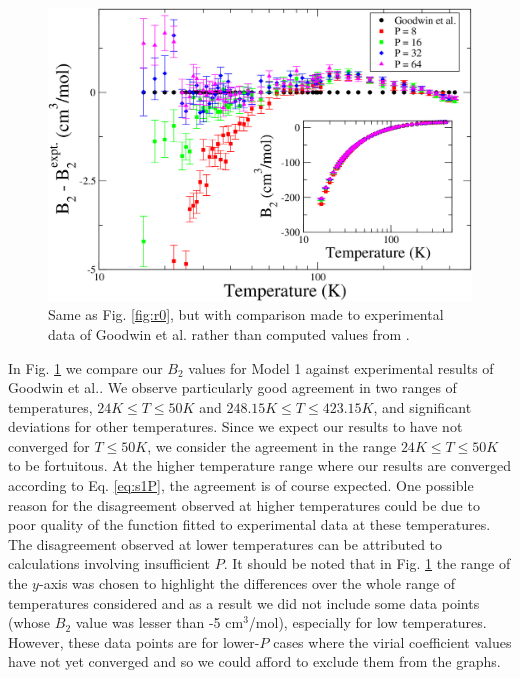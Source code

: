                 \begin{figure}[!htbp]
                    \centering
                    \includegraphics[scale=0.20,keepaspectratio]{Chapter-4/Figures/s1GoodwinAll.png}
                    \caption{Same as Fig. \ref{fig:r0}, but with comparison made to experimental data of Goodwin et al.\cite{Goodwin1963} rather than computed values from \cite{Garberoglio2014}.}
                    \label{fig:r0Goodwin}
                \end{figure}
                In Fig. \ref{fig:r0Goodwin} we compare our $B_2$ values for Model 1 against experimental results of Goodwin et al.\cite{Goodwin1963}. We observe particularly good agreement in two ranges of temperatures, $24 K \le T \le 50 K$ and $ 248.15 K \le T \le 423.15 K$, and significant deviations for other temperatures. Since we expect our results to have not converged for $T \le 50 K$, we consider the agreement in the range $24 K \le T \le 50 K$ to be fortuitous. At the higher temperature range where our results are converged according to Eq. \eqref{eq:s1P}, the agreement is of course expected. One possible reason for the disagreement observed at higher temperatures could be due to poor quality of the function fitted to experimental data at these temperatures. The disagreement observed at lower temperatures can be attributed to calculations involving insufficient $P$. It should be noted that in Fig. \ref{fig:r0Goodwin} the range of the $y$-axis was chosen to highlight the differences over the whole range of temperatures considered and as a result we did not include some data points (whose $B_2$ value was lesser than -5 cm$^3$/mol), especially for low temperatures. However, these data points are for lower-$P$ cases where the virial coefficient values have not yet converged and so we could afford to exclude them from the graphs.

